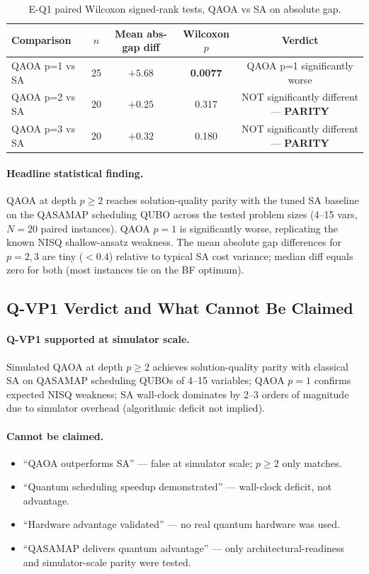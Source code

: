 \begin{table}[h!]
\centering
\caption{E-Q1 paired Wilcoxon signed-rank tests, QAOA vs SA on absolute gap.}
\label{tab:eq1_wilcoxon}
\begin{tabular}{lcccc}
\hline
\textbf{Comparison} & \textbf{$n$} & \textbf{Mean abs-gap diff} & \textbf{Wilcoxon $p$} & \textbf{Verdict} \\
\hline
QAOA p=1 vs SA & 25 & $+5.68$ & \textbf{0.0077} & QAOA p=1 significantly worse \\
QAOA p=2 vs SA & 20 & $+0.25$ & 0.317           & NOT significantly different --- \textbf{PARITY} \\
QAOA p=3 vs SA & 20 & $+0.32$ & 0.180           & NOT significantly different --- \textbf{PARITY} \\
\hline
\end{tabular}
\end{table}

\paragraph{Headline statistical finding.} QAOA at depth $p \ge 2$ reaches solution-quality parity with the tuned SA baseline on the QASAMAP scheduling QUBO across the tested problem sizes (4--15 vars, $N=20$ paired instances). QAOA $p = 1$ is significantly worse, replicating the known NISQ shallow-ansatz weakness. The mean absolute gap differences for $p = 2, 3$ are tiny ($< 0.4$) relative to typical SA cost variance; median diff equals zero for both (most instances tie on the BF optimum).

\subsection{Q-VP1 Verdict and What Cannot Be Claimed}

\paragraph{Q-VP1 supported at simulator scale.} Simulated QAOA at depth $p \ge 2$ achieves solution-quality parity with classical SA on QASAMAP scheduling QUBOs of 4--15 variables; QAOA $p=1$ confirms expected NISQ weakness; SA wall-clock dominates by 2--3 orders of magnitude due to simulator overhead (algorithmic deficit not implied).

\paragraph{Cannot be claimed.}
\begin{itemize}
    \item ``QAOA outperforms SA'' --- false at simulator scale; $p \ge 2$ only matches.
    \item ``Quantum scheduling speedup demonstrated'' --- wall-clock deficit, not advantage.
    \item ``Hardware advantage validated'' --- no real quantum hardware was used.
    \item ``QASAMAP delivers quantum advantage'' --- only architectural-readiness and simulator-scale parity were tested.
\end{itemize}


